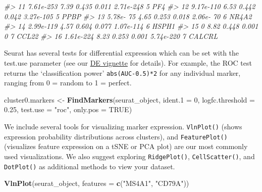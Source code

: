 \documentclass[
]{book}
\newenvironment{Shaded}{\begin{snugshade}}{\end{snugshade}}
\newcommand{\AttributeTok}[1]{\textcolor[rgb]{0.13,0.29,0.53}{#1}}
\newcommand{\CommentTok}[1]{\textcolor[rgb]{0.56,0.35,0.01}{\textit{#1}}}
\newcommand{\ConstantTok}[1]{\textcolor[rgb]{0.56,0.35,0.01}{#1}}
\newcommand{\DecValTok}[1]{\textcolor[rgb]{0.00,0.00,0.81}{#1}}
\newcommand{\FloatTok}[1]{\textcolor[rgb]{0.00,0.00,0.81}{#1}}
\newcommand{\FunctionTok}[1]{\textcolor[rgb]{0.13,0.29,0.53}{\textbf{#1}}}
\newcommand{\NormalTok}[1]{#1}
\newcommand{\OtherTok}[1]{\textcolor[rgb]{0.56,0.35,0.01}{#1}}
\newcommand{\StringTok}[1]{\textcolor[rgb]{0.31,0.60,0.02}{#1}}
\begin{document}
\begin{Shaded}
\begin{Highlighting}[]
\CommentTok{\#\textgreater{} 11 7.61e{-}253       7.39 0.435 0.011 2.71e{-}248 5       PF4   }
\CommentTok{\#\textgreater{} 12 9.17e{-}110       6.53 0.442 0.042 3.27e{-}105 5       PPBP  }
\CommentTok{\#\textgreater{} 13 5.78e{-} 75       4.65 0.253 0.018 2.06e{-} 70 6       NR4A2 }
\CommentTok{\#\textgreater{} 14 2.99e{-}119       4.57 0.604 0.077 1.07e{-}114 6       HSPH1 }
\CommentTok{\#\textgreater{} 15 0               8.82 0.448 0.001 0         7       CCL22 }
\CommentTok{\#\textgreater{} 16 1.61e{-}224       8.23 0.253 0.001 5.74e{-}220 7       CALCRL}
\end{Highlighting}
\end{Shaded}

Seurat has several tests for differential expression which can be set with the test.use parameter (see our \href{de_vignette.html}{DE vignette} for details). For example, the ROC test returns the `classification power' \texttt{abs(AUC-0.5)*2} for any individual marker, ranging from 0 = random to 1 = perfect.

\begin{Shaded}
\begin{Highlighting}[]
\NormalTok{cluster0.markers }\OtherTok{\textless{}{-}} \FunctionTok{FindMarkers}\NormalTok{(seurat\_object, }\AttributeTok{ident.1 =} \DecValTok{0}\NormalTok{, }\AttributeTok{logfc.threshold =} \FloatTok{0.25}\NormalTok{, }\AttributeTok{test.use =} \StringTok{"roc"}\NormalTok{, }\AttributeTok{only.pos =} \ConstantTok{TRUE}\NormalTok{)}
\end{Highlighting}
\end{Shaded}

We include several tools for visualizing marker expression. \texttt{VlnPlot()} (shows expression probability distributions across clusters), and \texttt{FeaturePlot()} (visualizes feature expression on a tSNE or PCA plot) are our most commonly used visualizations. We also suggest exploring \texttt{RidgePlot()}, \texttt{CellScatter()}, and \texttt{DotPlot()} as additional methods to view your dataset.

\begin{Shaded}
\begin{Highlighting}[]
\FunctionTok{VlnPlot}\NormalTok{(seurat\_object, }\AttributeTok{features =} \FunctionTok{c}\NormalTok{(}\StringTok{"MS4A1"}\NormalTok{, }\StringTok{"CD79A"}\NormalTok{))}
\end{Highlighting}
\end{Shaded}
\end{document}
